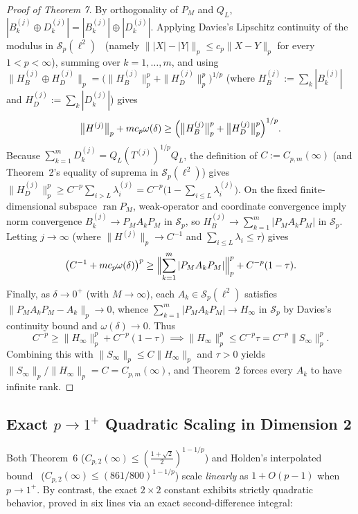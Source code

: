 \documentclass[10pt,letterpaper]{article}
\newcommand{\Sp}{\mathcal{S}_p}
\newcommand{\ran}{\operatorname{ran}}
\begin{document}
\begin{proof}[Proof of Theorem 7]
By orthogonality of $P_M$ and $Q_L$, $|B_k^{(j)} \oplus D_k^{(j)}| = |B_k^{(j)}| \oplus |D_k^{(j)}|$. Applying Davies's Lipschitz continuity of the modulus in $\Sp(\ell^2)$~\cite{Davies1988} (namely $\||X| - |Y|\|_p \le c_p \|X - Y\|_p$ for every $1 < p < \infty$), summing over $k = 1,\dots,m$, and using $\|H_B^{(j)} \oplus H_D^{(j)}\|_p = \bigl(\|H_B^{(j)}\|_p^p + \|H_D^{(j)}\|_p^p\bigr)^{1/p}$ (where $H_B^{(j)} := \sum_k |B_k^{(j)}|$ and $H_D^{(j)} := \sum_k |D_k^{(j)}|$) gives
\[
  \bigl\|H^{(j)}\bigr\|_p + m c_p \omega(\delta) \ge \Bigl(\bigl\|H_B^{(j)}\bigr\|_p^p + \bigl\|H_D^{(j)}\bigr\|_p^p\Bigr)^{1/p}.
\]
Because $\sum_{k=1}^m D_k^{(j)} = Q_L (T^{(j)})^{1/p} Q_L$, the definition of $C := C_{p,m}(\infty)$ (and Theorem~2's equality of suprema in $\Sp(\ell^2)$) gives $\|H_D^{(j)}\|_p^p \ge C^{-p}\sum_{i > L} \lambda_i^{(j)} = C^{-p}\bigl(1 - \sum_{i \le L} \lambda_i^{(j)}\bigr)$. On the fixed finite-dimensional subspace $\ran P_M$, weak-operator and coordinate convergence imply norm convergence $B_k^{(j)} \to P_M A_k P_M$ in $\Sp$, so $H_B^{(j)} \to \sum_{k=1}^m |P_M A_k P_M|$ in $\Sp$. Letting $j \to \infty$ (where $\|H^{(j)}\|_p \to C^{-1}$ and $\sum_{i \le L} \lambda_i \le \tau$) gives
\[
  \bigl(C^{-1} + m c_p \omega(\delta)\bigr)^p \ge \Bigl\|\sum_{k=1}^m |P_M A_k P_M|\Bigr\|_p^p + C^{-p}(1 - \tau).
\]
Finally, as $\delta \to 0^+$ (with $M \to \infty$), each $A_k \in \Sp(\ell^2)$ satisfies $\|P_M A_k P_M - A_k\|_p \to 0$, whence $\sum_{k=1}^m |P_M A_k P_M| \to H_\infty$ in $\Sp$ by Davies's continuity bound and $\omega(\delta) \to 0$. Thus
\[
  C^{-p} \ge \|H_\infty\|_p^p + C^{-p}(1 - \tau) \implies \|H_\infty\|_p^p \le C^{-p}\tau = C^{-p}\|S_\infty\|_p^p.
\]
Combining this with $\|S_\infty\|_p \le C \|H_\infty\|_p$ and $\tau > 0$ yields $\|S_\infty\|_p / \|H_\infty\|_p = C = C_{p,m}(\infty)$, and Theorem~2 forces every $A_k$ to have infinite rank.
\end{proof}

\subsection{Exact $p \to 1^+$ Quadratic Scaling in Dimension 2}

Both Theorem~6 ($C_{p,2}(\infty) \le (\frac{1+\sqrt{2}}{2})^{1-1/p}$) and Holden's interpolated bound~\cite[(4)]{Holden2026b} ($C_{p,2}(\infty) \le (861/800)^{1-1/p}$) scale \emph{linearly} as $1 + O(p-1)$ when $p \to 1^+$. By contrast, the exact $2\times 2$ constant exhibits strictly quadratic behavior, proved in six lines via an exact second-difference integral:
\end{document}
